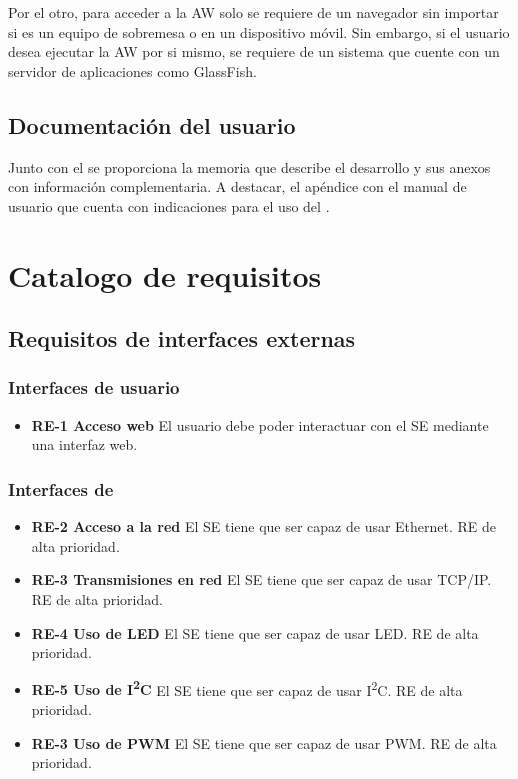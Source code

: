Por el otro, para acceder a la AW solo se requiere de un navegador sin importar
si es un equipo de sobremesa o en un dispositivo móvil. Sin embargo,
si el usuario desea ejecutar la AW por si mismo, se requiere de un sistema
que cuente con un servidor de aplicaciones como GlassFish.

\subsection{Documentación del usuario} \label{sec:spec-docs}
Junto con el  se proporciona la memoria que describe
el desarrollo y sus anexos con información complementaria. A destacar, el
apéndice con el manual de usuario que cuenta con indicaciones para el uso del
.

\section{Catalogo de requisitos}

\subsection{Requisitos de interfaces externas} \label{sec:spec-interfaces}
\subsubsection{Interfaces de usuario} \label{sec:spec-interfaces-usuario}
\begin{itemize}
  \item \textbf{RE-1 Acceso web} El usuario debe poder interactuar con el SE
  mediante una interfaz web.
\end{itemize}

\subsubsection{Interfaces de }
\label{sec:spec-interfaces-hw}
\begin{itemize}
  \item \textbf{RE-2 Acceso a la red} El SE tiene que ser capaz de usar
  Ethernet. RE de alta prioridad.
  \item \textbf{RE-3 Transmisiones en red} El SE tiene que ser capaz de usar
  TCP/IP. RE de alta prioridad.
  \item \textbf{RE-4 Uso de LED} El SE tiene que ser capaz de usar LED. RE de
  alta prioridad.
  \item \textbf{RE-5 Uso de I\textsuperscript{2}C} El SE tiene que ser
  capaz de usar I\textsuperscript{2}C. RE de alta prioridad.
  \item \textbf{RE-3 Uso de PWM} El SE tiene que ser capaz de usar PWM. RE de
  alta prioridad.
\end{itemize}

